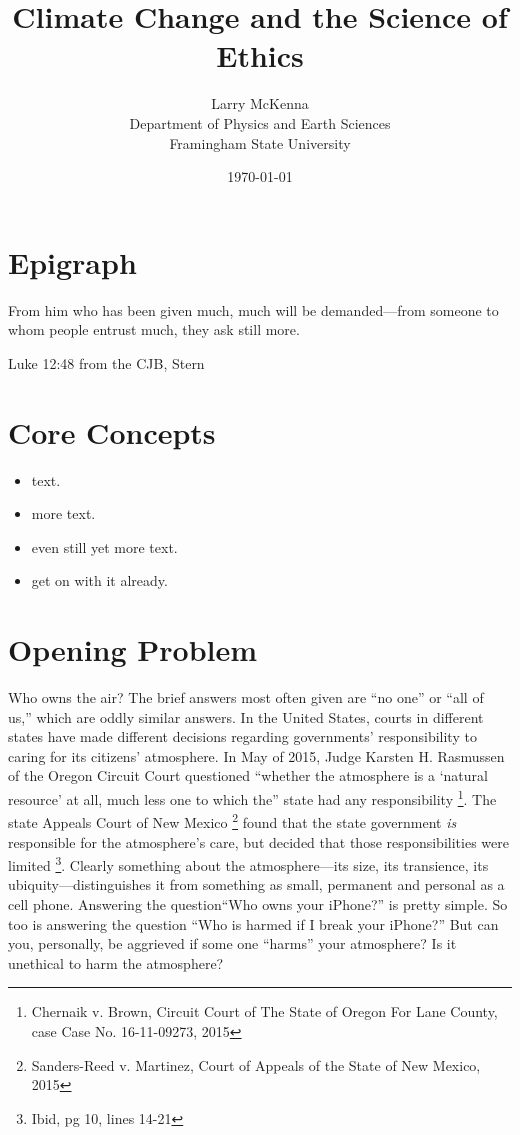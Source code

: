 \documentclass[amstex,12pt]{book}
\begin{document}
\title{Climate Change and the Science of Ethics}\label{chap:2_CCEthics}
\date{\today}
\author{Larry McKenna\\Department of Physics and Earth Sciences\\Framingham State University}
\maketitle
\section*{Epigraph}
\epigraph{From him who has been given much, much will be demanded---from someone to whom people entrust much, they ask still more.}{Luke 12:48 from the CJB, Stern} 

\section{Core Concepts}
\begin{itemize}
	\item	text.
	\item	more text.
	\item	even still yet more text.
	\item	get on with it already.
\end{itemize}

\section{Opening Problem} 
Who owns the air? The brief answers most often given are ``no one'' or ``all of us,'' which are oddly similar answers. In the United States, courts in different states have made different decisions regarding  governments' responsibility to caring for its citizens' atmosphere. In May of 2015, Judge Karsten H. Rasmussen of the Oregon Circuit Court questioned
``whether the atmosphere is a `natural resource' at all, much less one to which the'' state had any responsibility \footnote{Chernaik v. Brown, Circuit Court of The State of Oregon For Lane County, case Case No. 16-11-09273, 2015}. The state Appeals Court of New Mexico \footnote{Sanders-Reed v. Martinez, Court of Appeals of the State of New Mexico, 2015} found that the state government \emph{is} responsible for the atmosphere's care, but decided that those responsibilities were limited \footnote{Ibid, pg 10, lines 14-21}. Clearly something about the atmosphere---its size, its transience, its ubiquity---distinguishes it from something as small, permanent and personal as a cell phone. Answering the question``Who owns your iPhone?'' is pretty simple. So too is answering the question ``Who is harmed if I break your iPhone?'' But can you, personally, be aggrieved if some one ``harms'' your atmosphere? Is it unethical to harm the atmosphere?
 
\end{document}
